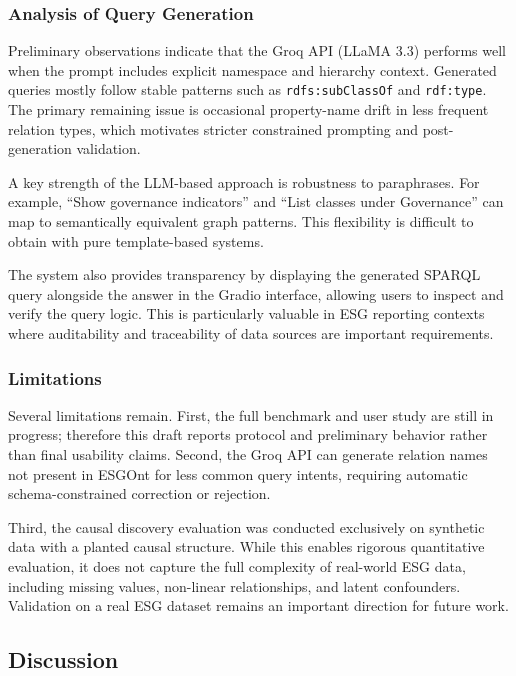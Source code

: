 \documentclass[a4paper,11pt,oneside]{article}
\begin{document}
\subsubsection{Analysis of Query Generation}

Preliminary observations indicate that the Groq API (LLaMA 3.3) performs well when the prompt includes explicit namespace and hierarchy context. Generated queries mostly follow stable patterns such as \texttt{rdfs:subClassOf} and \texttt{rdf:type}. The primary remaining issue is occasional property-name drift in less frequent relation types, which motivates stricter constrained prompting and post-generation validation.

A key strength of the LLM-based approach is robustness to paraphrases. For example, “Show governance indicators” and “List classes under Governance” can map to semantically equivalent graph patterns. This flexibility is difficult to obtain with pure template-based systems.

The system also provides transparency by displaying the generated SPARQL query alongside the answer in the Gradio interface, allowing users to inspect and verify the query logic. This is particularly valuable in ESG reporting contexts where auditability and traceability of data sources are important requirements.

\subsubsection{Limitations}

Several limitations remain. First, the full benchmark and user study are still in progress; therefore this draft reports protocol and preliminary behavior rather than final usability claims. Second, the Groq API can generate relation names not present in ESGOnt for less common query intents, requiring automatic schema-constrained correction or rejection.

Third, the causal discovery evaluation was conducted exclusively on synthetic data with a planted causal structure. While this enables rigorous quantitative evaluation, it does not capture the full complexity of real-world ESG data, including missing values, non-linear relationships, and latent confounders. Validation on a real ESG dataset remains an important direction for future work.

\subsection{Discussion}
\end{document}

